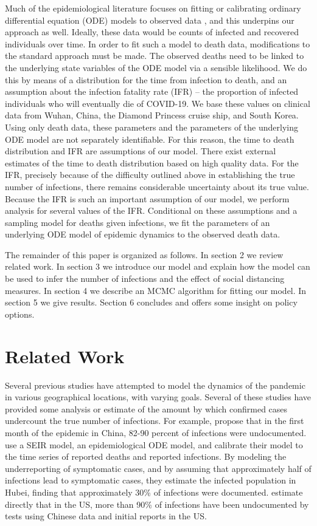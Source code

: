\documentclass[11pt]{article}
\theoremstyle{plain}
\newcommand{\1}{\mathbf 1}
\begin{document}
Much of the epidemiological literature focuses on fitting or calibrating ordinary differential equation (ODE) models to observed data \cite{hethcote2000mathematics}, and this underpins our approach as well. Ideally, these data would be counts of infected and recovered individuals over time. In order to fit such a model to death data, modifications to the standard approach must be made. The observed deaths need to be linked to the underlying state variables of the ODE model via a sensible likelihood. We do this by means of a distribution for the time from infection to death, and an assumption about the infection fatality rate (IFR) -- the proportion of infected individuals who will eventually die of COVID-19. We base these values on clinical data from Wuhan, China, the Diamond Princess cruise ship, and South Korea. Using only death data, these parameters and the parameters of the underlying ODE model are not separately identifiable. For this reason, the time to death distribution and IFR are assumptions of our model. There exist external estimates of the time to death distribution based on high quality data. For the IFR, precisely because of the difficulty outlined above in establishing the true number of infections, there remains considerable uncertainty about its true value.  Because the IFR is such an important assumption of our model, we perform analysis for several values of the IFR. Conditional on these assumptions and a sampling model for deaths given infections, we fit the parameters of an underlying ODE model of epidemic dynamics to the observed death data. 

The remainder of this paper is organized as follows. In section 2 we review related work. In section 3 we introduce our model and explain how the model can be used to infer the number of infections and the effect of social distancing measures. In section 4 we describe an MCMC algorithm for fitting our model. In section 5 we give results. Section 6 concludes and offers some insight on policy options.

\section{Related Work}

Several previous studies have attempted to model the dynamics of the pandemic in various geographical locations, with varying goals. Several of these studies have provided some analysis or estimate of the amount by which confirmed cases undercount the true number of infections. For example, \citet{li2020substantial} propose that in the first month of the epidemic in China, 82-90 percent of infections were undocumented. \citet{riou2020adjusted} use a SEIR model, an epidemiological ODE model, and calibrate their model to the time series of reported deaths and reported infections. By modeling the underreporting of symptomatic cases, and by assuming that approximately half of infections lead to symptomatic cases, they estimate the infected population in Hubei, finding that approximately 30\% of infections were documented. \citet{perkins2020estimating} estimate directly that in the US, more than 90\% of infections have been undocumented by tests using Chinese data and initial reports in the US.
\end{document}

